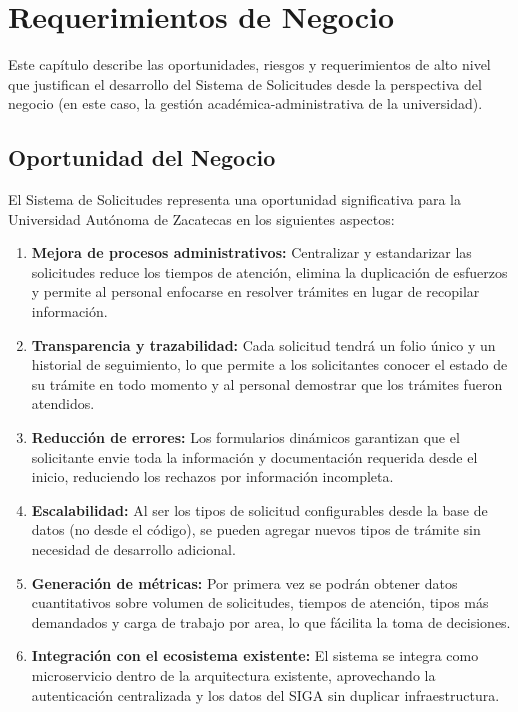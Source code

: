 \chapter{Requerimientos de Negocio}

Este capítulo describe las oportunidades, riesgos y requerimientos de alto nivel que justifican el desarrollo del Sistema de Solicitudes desde la perspectiva del negocio (en este caso, la gestión académica-administrativa de la universidad).

\section{Oportunidad del Negocio}

El Sistema de Solicitudes representa una oportunidad significativa para la Universidad Autónoma de Zacatecas en los siguientes aspectos:

\begin{enumerate}
    \item \textbf{Mejora de procesos administrativos:} Centralizar y estandarizar las solicitudes reduce los tiempos de atención, elimina la duplicación de esfuerzos y permite al personal enfocarse en resolver trámites en lugar de recopilar información.

    \item \textbf{Transparencia y trazabilidad:} Cada solicitud tendrá un folio único y un historial de seguimiento, lo que permite a los solicitantes conocer el estado de su trámite en todo momento y al personal demostrar que los trámites fueron atendidos.

    \item \textbf{Reducción de errores:} Los formularios dinámicos garantizan que el solicitante envie toda la información y documentación requerida desde el inicio, reduciendo los rechazos por información incompleta.

    \item \textbf{Escalabilidad:} Al ser los tipos de solicitud configurables desde la base de datos (no desde el código), se pueden agregar nuevos tipos de trámite sin necesidad de desarrollo adicional.

    \item \textbf{Generación de métricas:} Por primera vez se podrán obtener datos cuantitativos sobre volumen de solicitudes, tiempos de atención, tipos más demandados y carga de trabajo por area, lo que fácilita la toma de decisiones.

    \item \textbf{Integración con el ecosistema existente:} El sistema se integra como microservicio dentro de la arquitectura existente, aprovechando la autenticación centralizada y los datos del SIGA sin duplicar infraestructura.
\end{enumerate}


